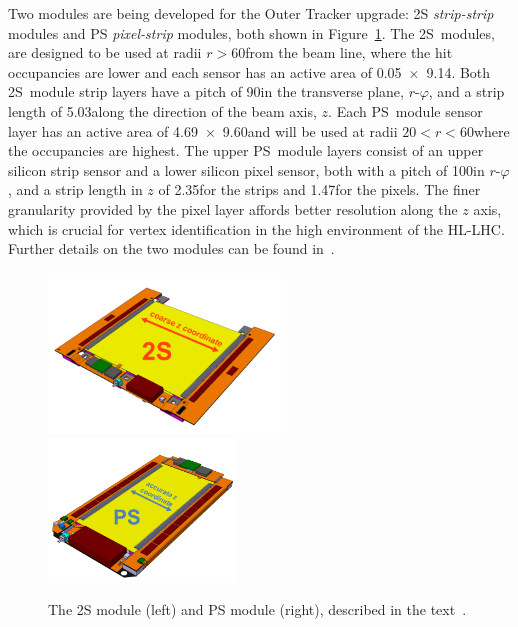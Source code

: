 Two \pT modules are being developed for the Outer Tracker upgrade: 2S \emph{strip-strip} modules and PS \emph{pixel-strip} modules, both shown in Figure~\ref{fig:2Spsmodules}.
The 2S~modules, are designed to be used at radii $r>60$\cm from the beam line, where the hit occupancies are lower and each sensor has an active area of 0.05\cm~$\times$~9.14\cm.
Both 2S~module strip layers have a pitch of 90\mum in the transverse plane, $r$-$\varphi$, and a strip length of 5.03\cm along the direction of the beam axis, $z$.
Each PS~module sensor layer has an active area of 4.69\cm~$\times$~9.60\cm and will be used at radii $20<r<60$\cm where the occupancies are highest.
The upper PS~module layers consist of an upper silicon strip sensor and a lower silicon pixel sensor, both with a pitch of 100\mum in $r$-$\varphi$, and a strip length in $z$ of 2.35\cm for the strips and 1.47\mm for the pixels.
The finer granularity provided by the pixel layer affords better resolution along the $z$ axis, which is crucial for vertex identification in the high \PU environment of the HL-LHC.
Further details on the two \pT modules can be found in~\cite{CMS_Upgrade_TP,P2TrackerTDR}.
 
\begin{figure}[tp]
\centering
\includegraphics[width=0.55\textwidth,trim={0truecm 0truecm 0truecm 1truecm},clip]{figs/tk-upgrade/2S_assembled.png}
\hfill
\includegraphics[width=0.44\textwidth,trim={0truecm 0truecm 0truecm 1truecm},clip]{figs/tk-upgrade/PS_assembled.png}
\caption{The 2S module (left) and PS module (right), described in the text~\cite{P2TrackerTDR}.}
\label{fig:2Spsmodules}
\end{figure}

